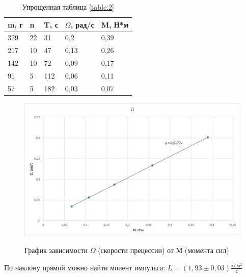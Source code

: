 \documentclass[a4paper,12pt]{article} %
\begin{document}
\begin{enumerate}
\begin{table} [H] \center
\begin{tabular}{l|l|l|l|l}
m, г&n&T, с&$\Omega$, рад/с&M, Н*м\\
\hline
 329 &22& 31 & 0,2 & 0,39 \\
 217 &10& 47 & 0,13 & 0,26 \\
 142 &10& 72 & 0,09 & 0,17 \\
 91 &5& 112 & 0,06 & 0,11 \\
 57 &5& 182 & 0,03 & 0,07 \\
\end{tabular}
\caption{Упрощенная таблица \ref{table:2} \label{table:3}}
\end{table}

\begin{figure} [H] \center
	\includegraphics[scale=0.8]{./data/graph1.png}
	\label{graph:1} \label{pic:4}
	\caption[Рис. 4]{График зависимости $\Omega$ (скорости прецессии) от М (момента сил)}
\end{figure}

По наклону прямой можно найти моиент импульса: 
$L = (1,93 \pm 0,03) \frac{\text{кг}\ \text{м}^2}{\text{с}}$

\newpage


\end{enumerate}
\end{document}
